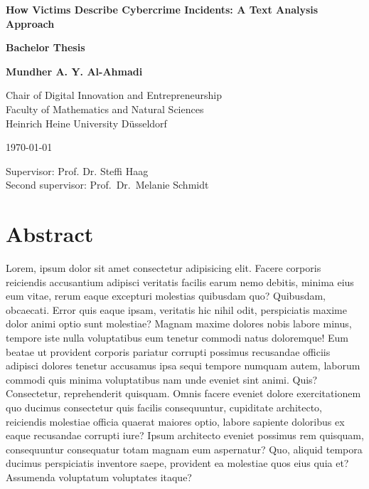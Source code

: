 \documentclass[12pt,english,titlepage,a4paper]{article}
\begin{document}
\begin{titlepage}
\begin{center}

\textbf{\LARGE How Victims Describe Cybercrime Incidents: A Text Analysis Approach}

\bigskip\bigskip
\textbf{Bachelor Thesis}

\bigskip
\textbf{Mundher A. Y. Al-Ahmadi}



\vfill
Chair of Digital Innovation and Entrepreneurship\\ 
Faculty of Mathematics and Natural Sciences \\ 
Heinrich Heine University D\"usseldorf

\bigskip
\today

\bigskip
Supervisor: Prof. Dr. Steffi Haag \\
Second supervisor: Prof.\ Dr.\ Melanie Schmidt

\end{center}
\end{titlepage}

\thispagestyle{empty}\mbox{}\pagebreak
\setcounter{page}{0}





\tableofcontents
\pagebreak

\section*{Abstract}
Lorem, ipsum dolor sit amet consectetur adipisicing elit. Facere corporis reiciendis accusantium adipisci veritatis facilis earum nemo debitis, minima eius eum vitae, rerum eaque excepturi molestias quibusdam quo? Quibusdam, obcaecati.
Error quis eaque ipsam, veritatis hic nihil odit, perspiciatis maxime dolor animi optio sunt molestiae? Magnam maxime dolores nobis labore minus, tempore iste nulla voluptatibus eum tenetur commodi natus doloremque!
Eum beatae ut provident corporis pariatur corrupti possimus recusandae officiis adipisci dolores tenetur accusamus ipsa sequi tempore numquam autem, laborum commodi quis minima voluptatibus nam unde eveniet sint animi. Quis?
Consectetur, reprehenderit quisquam. Omnis facere eveniet dolore exercitationem quo ducimus consectetur quis facilis consequuntur, cupiditate architecto, reiciendis molestiae officia quaerat maiores optio, labore sapiente doloribus ex eaque recusandae corrupti iure?
Ipsum architecto eveniet possimus rem quisquam, consequuntur consequatur totam magnam eum aspernatur? Quo, aliquid tempora ducimus perspiciatis inventore saepe, provident ea molestiae quos eius quia et? Assumenda voluptatum voluptates itaque?
\end{document}
